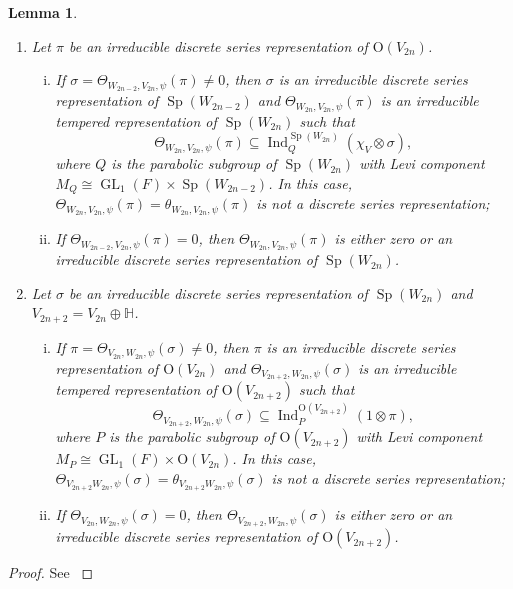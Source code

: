 \documentclass[article]{article}
\numberwithin{equation}{section}
\newtheorem{lemma}[theorem]{Lemma}
\theoremstyle{definition}
\DeclareMathOperator{\Ind}{Ind}
\DeclareMathOperator{\GL}{GL}
\DeclareMathOperator{\SP}{Sp}
\begin{document}
\begin{lemma}\label{thetadiscrete} 
	\begin{enumerate}
		\item Let $\pi$ be an irreducible discrete series representation of $\mathrm O(V_{2n})$. 
		\begin{enumerate}[(i)]
			\item If $\sigma=\Theta_{W_{2n-2},V_{2n},\psi}(\pi)\neq 0$, then $\sigma$ is an irreducible discrete series representation of $\SP(W_{2n-2})$ and $\Theta_{W_{2n},V_{2n},\psi}(\pi)$ is an irreducible tempered  representation of $\SP(W_{2n})$ such that 
			$$
			\Theta_{W_{2n},V_{2n},\psi}(\pi)\subseteq \Ind_{Q}^{\SP(W_{2n})}\left(\chi_{V}\otimes \sigma \right),
			$$
			where $Q$ is the parabolic subgroup of $\SP(W_{2n})$ with Levi component $M_{Q}\cong \GL_1(F)\times \SP(W_{2n-2})$. 
			In this case,  $\Theta_{W_{2n},V_{2n},\psi}(\pi)=\theta_{W_{2n},V_{2n},\psi}(\pi)$ is not a discrete series representation; 
			\item If $\Theta_{W_{2n-2},V_{2n},\psi}(\pi)= 0$, then $\Theta_{W_{2n},V_{2n},\psi}(\pi)$ is either zero or an irreducible discrete series representation of $\SP(W_{2n})$. 
		\end{enumerate}
		\item Let $\sigma$ be an irreducible discrete series representation of $\SP(W_{2n})$ and $V_{2n+2}=V_{2n}\oplus \mathbb H$. 
		\begin{enumerate}[(i)]
			\item If $\pi=\Theta_{V_{2n},W_{2n},\psi}(\sigma)\neq 0$, then $\pi$ is an irreducible discrete series representation of $\mathrm O(V_{2n})$ and $\Theta_{V_{2n+2},W_{2n},\psi}(\sigma)$ is an irreducible tempered representation of $\mathrm O(V_{2n+2})$ such that 
			$$
			\Theta_{V_{2n+2},W_{2n},\psi}(\sigma)\subseteq \Ind_{P}^{\mathrm O(V_{2n+2})}\left(\mathrm{1}\otimes \pi \right),
			$$
			where $P$ is the parabolic subgroup of $\mathrm O(V_{2n+2})$ with Levi component $M_{P}\cong \GL_1(F)\times \mathrm O(V_{2n})$. In this case,  $\Theta_{V_{2n+2}^,W_{2n},\psi}(\sigma)=\theta_{V_{2n+2}^,W_{2n},\psi}(\sigma)$ is not a discrete series representation;
			\item  If $\Theta_{V_{2n},W_{2n},\psi}(\sigma)= 0$, then $\Theta_{V_{2n+2},W_{2n},\psi}(\sigma)$ is either zero or an irreducible discrete series representation of $\mathrm O(V_{2n+2})$.
		\end{enumerate}
	\end{enumerate}	
\end{lemma}
\begin{proof}
	See \cite[Corollary C.3]{MR3166215}
\end{proof}
\end{document}
